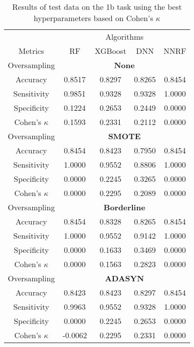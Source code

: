 \begin{table}[!htb]
\centering
\caption{Results of test data on the 1b task using the best hyperparameters based on Cohen's $\kappa$}
\label{tab:1b_test_results}
\begin{tabular}{c | c c c c}
\hline
 & \multicolumn{4}{c}{Algorithms}\\ 
Metrics &RF & XGBoost & DNN & NNRF\\ 
\hline
Oversampling &\multicolumn{4}{|c}{\textbf{None}}\\ 
\hline
Accuracy & 0.8517 & 0.8297 & 0.8265 & 0.8454\\ 
Sensitivity & 0.9851 & 0.9328 & 0.9328 & 1.0000\\ 
Specificity & 0.1224 & 0.2653 & 0.2449 & 0.0000\\ 
Cohen's $\kappa$ & 0.1593 & 0.2331 & 0.2112 & 0.0000\\ 
\hline
Oversampling &\multicolumn{4}{|c}{\textbf{SMOTE}}\\ 
\hline
Accuracy & 0.8454 & 0.8423 & 0.7950 & 0.8454\\ 
Sensitivity & 1.0000 & 0.9552 & 0.8806 & 1.0000\\ 
Specificity & 0.0000 & 0.2245 & 0.3265 & 0.0000\\ 
Cohen's $\kappa$ & 0.0000 & 0.2295 & 0.2089 & 0.0000\\ 
\hline
Oversampling &\multicolumn{4}{|c}{\textbf{Borderline}}\\ 
\hline
Accuracy & 0.8454 & 0.8328 & 0.8265 & 0.8454\\ 
Sensitivity & 1.0000 & 0.9552 & 0.9142 & 1.0000\\ 
Specificity & 0.0000 & 0.1633 & 0.3469 & 0.0000\\ 
Cohen's $\kappa$ & 0.0000 & 0.1563 & 0.2823 & 0.0000\\ 
\hline
Oversampling &\multicolumn{4}{|c}{\textbf{ADASYN}}\\ 
\hline
Accuracy & 0.8423 & 0.8423 & 0.8297 & 0.8454\\ 
Sensitivity & 0.9963 & 0.9552 & 0.9328 & 1.0000\\ 
Specificity & 0.0000 & 0.2245 & 0.2653 & 0.0000\\ 
Cohen's $\kappa$ & -0.0062 & 0.2295 & 0.2331 & 0.0000\\ 
\hline
\end{tabular}
\end{table}


